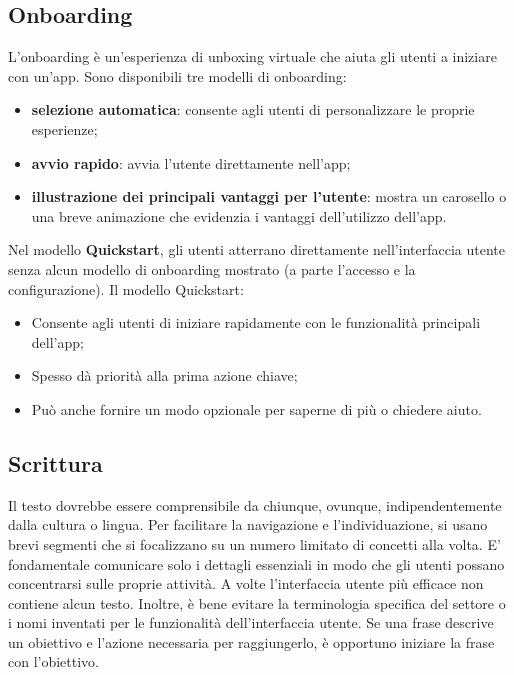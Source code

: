 \documentclass[12pt, a4paper]{report}
\begin{document}
	\subsection{Onboarding}
	L'onboarding è un'esperienza di unboxing virtuale che aiuta gli utenti a iniziare con un'app. Sono disponibili tre modelli di onboarding:
	\begin{itemize}
		\item \textbf{selezione automatica}: consente agli utenti di personalizzare le proprie esperienze;
		\item  \textbf{avvio rapido}: avvia l'utente direttamente nell'app;
		\item  \textbf{illustrazione dei principali vantaggi per l'utente}: mostra un carosello o una breve animazione che evidenzia i vantaggi dell'utilizzo dell'app.
	\end{itemize}
	Nel modello \textbf{Quickstart}, gli utenti atterrano direttamente nell'interfaccia utente senza alcun modello di onboarding mostrato (a parte l'accesso e la configurazione). Il modello Quickstart:
	\begin{itemize}
		\item Consente agli utenti di iniziare rapidamente con le funzionalità principali dell'app;
		\item Spesso dà priorità alla prima azione chiave;
		\item Può anche fornire un modo opzionale per saperne di più o chiedere aiuto.
	\end{itemize}

	\subsection{Scrittura}
	Il testo dovrebbe essere comprensibile da chiunque, ovunque, indipendentemente dalla cultura o lingua. Per facilitare la navigazione e l'individuazione, si usano brevi segmenti che si focalizzano su un numero limitato di concetti alla volta. E’ fondamentale comunicare solo
	i dettagli essenziali in modo che gli utenti possano concentrarsi sulle proprie attività. A volte l'interfaccia utente più efficace non contiene alcun testo.  Inoltre, è bene evitare la terminologia specifica del settore o i nomi inventati per le funzionalità dell'interfaccia utente.
	Se una frase descrive un obiettivo e l'azione necessaria per raggiungerlo, è opportuno iniziare la frase con l'obiettivo.
\end{document}
